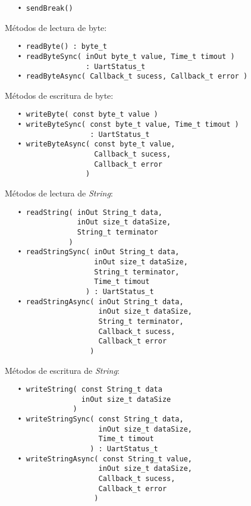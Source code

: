 \begin{verbatim}
   • sendBreak()
\end{verbatim}


Métodos de lectura de byte:

\begin{verbatim}
   • readByte() : byte_t
   • readByteSync( inOut byte_t value, Time_t timout )
                   : UartStatus_t
   • readByteAsync( Callback_t sucess, Callback_t error )
\end{verbatim}

Métodos de escritura de byte:

\begin{verbatim}
   • writeByte( const byte_t value )
   • writeByteSync( const byte_t value, Time_t timout )
                    : UartStatus_t
   • writeByteAsync( const byte_t value, 
                     Callback_t sucess,
                     Callback_t error 
                   )
\end{verbatim}

Métodos de lectura de \emph{String}:

\begin{verbatim}
   • readString( inOut String_t data,
                 inOut size_t dataSize,
                 String_t terminator
               )
   • readStringSync( inOut String_t data,
                     inOut size_t dataSize,
                     String_t terminator,
                     Time_t timout 
                   ) : UartStatus_t
   • readStringAsync( inOut String_t data,
                      inOut size_t dataSize,
   	                  String_t terminator,
                      Callback_t sucess, 
                      Callback_t error 
                    ) 
\end{verbatim}

Métodos de escritura de \emph{String}:                  
                
\begin{verbatim}  
   • writeString( const String_t data
                  inOut size_t dataSize
                )
   • writeStringSync( const String_t data,
                      inOut size_t dataSize,
                      Time_t timout
                    ) : UartStatus_t
   • writeStringAsync( const String_t value, 
                      inOut size_t dataSize,
                      Callback_t sucess,
                      Callback_t error
                     )
\end{verbatim}

